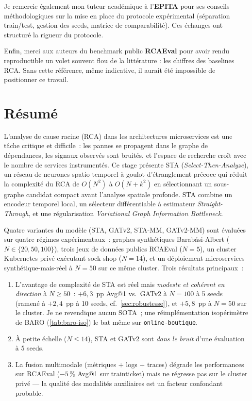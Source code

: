 \documentclass[a4paper,11pt,oneside]{report}
\begin{document}
Je remercie \'egalement mon tuteur acad\'emique \`a l'\textbf{EPITA} pour ses conseils m\'ethodologiques sur la mise en place du protocole exp\'erimental (s\'eparation train/test, gestion des seeds, matrice de comparabilit\'e). Ces \'echanges ont structur\'e la rigueur du protocole.

Enfin, merci aux auteurs du benchmark public \textbf{RCAEval} pour avoir rendu reproductible un volet souvent flou de la litt\'erature : les chiffres des baselines RCA. Sans cette r\'ef\'erence, m\^eme indicative, il aurait \'et\'e impossible de positionner ce travail.

\chapter*{R\'esum\'e}

L'analyse de cause racine (RCA) dans les architectures microservices est une t\^ache critique et difficile~: les pannes se propagent dans le graphe de d\'ependances, les signaux observ\'es sont bruit\'es, et l'espace de recherche cro\^it avec le nombre de services instrument\'es. Ce stage pr\'esente STA (\emph{Select-Then-Analyze}), un r\'eseau de neurones spatio-temporel \`a goulot d'\'etranglement pr\'ecoce qui r\'eduit la complexit\'e du RCA de $O(N^2)$ \`a $O(N + k^2)$ en s\'electionnant un sous-graphe candidat compact avant l'analyse spatiale profonde. STA combine un encodeur temporel local, un s\'electeur diff\'erentiable \`a estimateur \emph{Straight-Through}, et une r\'egularisation \emph{Variational Graph Information Bottleneck}.

Quatre variantes du mod\`ele (STA, GATv2, STA-MM, GATv2-MM) sont \'evalu\'ees sur quatre r\'egimes exp\'erimentaux~: graphes synth\'etiques Barab\'asi-Albert ($N \in \{20,50,100\}$), trois jeux de donn\'ees publics RCAEval ($N{=}5$), un cluster Kubernetes priv\'e ex\'ecutant sock-shop ($N{=}14$), et un d\'eploiement microservices synth\'etique-mais-r\'eel \`a $N{=}50$ sur ce m\^eme cluster. Trois r\'esultats principaux~:
\begin{enumerate}
  \item L'avantage de complexit\'e de STA est r\'eel mais \emph{modeste et coh\'erent en direction} \`a $N \ge 50$~: $+6{,}3$~pp Avg@1 vs.\ GATv2 \`a $N{=}100$ \`a 5 seeds (ramen\'e \`a $+2{,}4$~pp \`a 10 seeds, cf.\ \cref{sec:robustesse}), et $+5{,}8$~pp \`a $N{=}50$ sur le cluster. Je ne revendique aucun SOTA~; une r\'eimpl\'ementation isop\'erim\`etre de BARO (\cref{tab:baro-iso}) le bat m\^eme sur \texttt{online-boutique}.
  \item \`A petite \'echelle ($N \le 14$), STA et GATv2 sont \emph{dans le bruit} d'une \'evaluation \`a 5 seeds.
  \item La fusion multimodale (m\'etriques + logs + traces) d\'egrade les performances sur RCAEval ($-5\,\%$ Avg@1 sur trainticket) mais ne r\'egresse pas sur le cluster priv\'e --- la qualit\'e des modalit\'es auxiliaires est un facteur confondant probable.
\end{enumerate}
\end{document}
